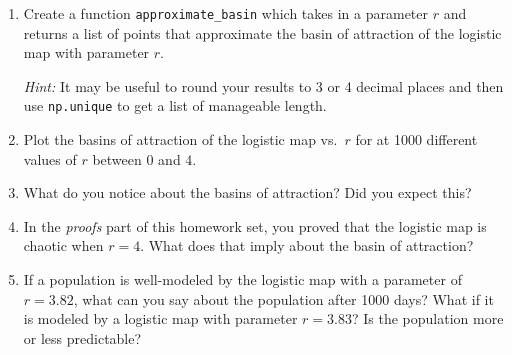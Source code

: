 \documentclass[letter]{article}
\begin{document}
\begin{enumerate}
		\begin{enumerate}
			\item Create a function \verb|approximate_basin| which takes in a parameter $r$ and returns a list
				of points that approximate the basin of attraction of the logistic map with parameter $r$.

				\emph{Hint:} It may be useful to round your results to 3 or 4 decimal places and then use {\tt np.unique}
				to get a list of manageable length.
			\item Plot the basins of attraction of the logistic map vs.~$r$ for at 1000 different values of $r$ between $0$
				and $4$.
			\item What do you notice about the basins of attraction? Did you expect this?
			\item In the \emph{proofs} part of this homework set, you proved that the logistic map is chaotic when $r=4$.
				What does that imply about the basin of attraction?

			\item If a population is well-modeled by the logistic map with a parameter of $r=3.82$, what can you say about the population
				after 1000 days? What if it is modeled by a logistic map with parameter $r=3.83$? Is the population more or less
				predictable?
		\end{enumerate}

	\end{enumerate}
\end{document}
